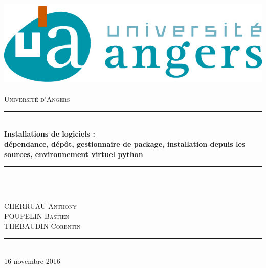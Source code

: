 \documentclass[a4paper,12pt]{article}
\newcommand{\HRule}{\rule{\linewidth}{0.5mm}}
\begin{document}
\begin{titlepage}
  \begin{sffamily}
  \begin{center}

    \includegraphics[scale=1]{univangers.jpg}~\\[1.5cm]

    \textsc{\LARGE Université d'Angers}\\[2cm]

   

    \HRule \\[0.4cm]
    { \huge \bfseries Installations de logiciels :}{ \bfseries  \\ dépendance, dépôt, gestionnaire de package, installation depuis les sources, environnement virtuel python\\[0.4cm] }

    \HRule \\[2cm]
    \\[2cm]
    

    \begin{minipage}{0.4\textwidth}
      \begin{flushleft} \large
        CHERRUAU \textsc{Anthony}\\
        POUPELIN \textsc{Bastien}\\
        THEBAUDIN \textsc{Corentin}\\
      \end{flushleft}
    \end{minipage}
    

    \vfill
\HRule\\[2cm]
    {\large 16 novembre 2016}

  \end{center}
  \end{sffamily}
\end{titlepage}
\clearpage

\tableofcontents
\end{document}
